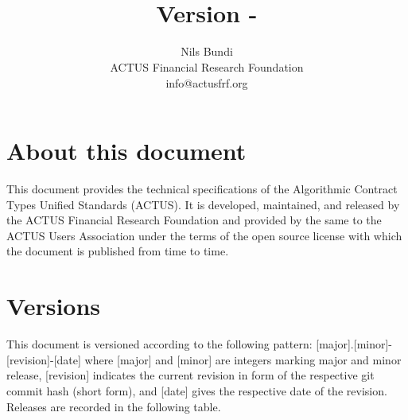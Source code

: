 \documentclass[9pt,oneside]{amsart}
\title{\doctitle \\
      {\smaller \textbf{Version \VersionNumber-\RevisionNumber}}}
\author{
	Nils Bundi\\
	ACTUS Financial Research Foundation\\
	info@actusfrf.org
}
\begin{document}
%

\maketitle


\section*{About this document}\label{sec:about}

This document provides the technical specifications of the Algorithmic Contract Types Unified Standards (ACTUS). It is developed, maintained, and released by the ACTUS Financial Research Foundation and provided by the same to the ACTUS Users Association under the terms of the open source license with which the document is published from time to time.


\section*{Versions}\label{sec:version}

This document is versioned according to the following pattern: [major].[minor]-[revision]-[date] where [major] and [minor] are integers marking major and minor release, [revision] indicates the current revision in form of the respective git commit hash (short form), and [date] gives the respective date of the revision. Releases are recorded in the following table.
\end{document}
